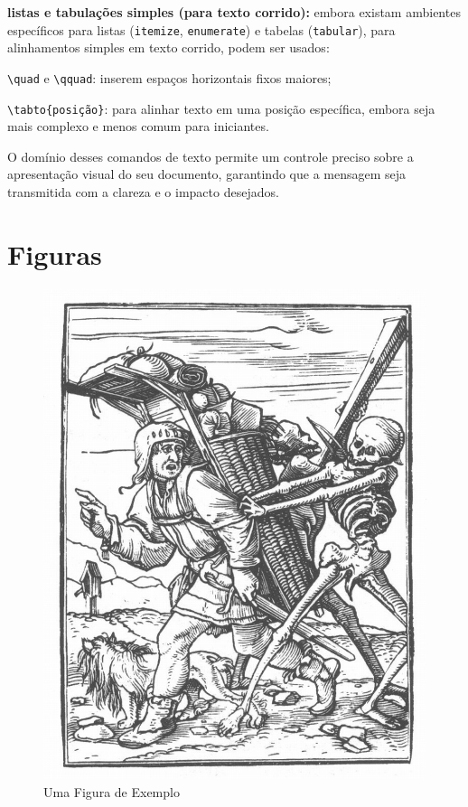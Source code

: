 \begin{alineas}
	\item \textbf{listas e tabulações simples (para texto corrido):} embora existam ambientes específicos para listas (\texttt{itemize}, \texttt{enumerate}) e tabelas (\texttt{tabular}), para alinhamentos simples em texto corrido, podem ser usados:
	\begin{alineas}
		\item \verb|\quad| e \verb|\qquad|: inserem espaços horizontais fixos maiores;
		\item \verb|\tabto{posição}|: para alinhar texto em uma posição específica, embora seja mais complexo e menos comum para iniciantes.
	\end{alineas}
\end{alineas}

O domínio desses comandos de texto permite um controle preciso sobre a apresentação visual do seu documento, garantindo que a mensagem seja transmitida com a clareza e o impacto desejados.





\section{Figuras} \label{sec:latexFiguras}

\begin{figure}[hbt!]
	\centering
	\caption{Uma Figura de Exemplo}\label{fig:exemplo} %
	\includegraphics[scale=0.3]{imgs/exemplo}
\end{figure}

